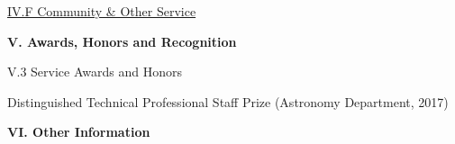 \documentclass[11pt,letterpaper]{article}
\begin{document}













\underline{IV.F Community \& Other Service}


\textbf{V. Awards, Honors and Recognition}



V.3 Service Awards and Honors

Distinguished Technical Professional Staff Prize (Astronomy Department, 2017)




\textbf{VI. Other Information}
\end{document}
